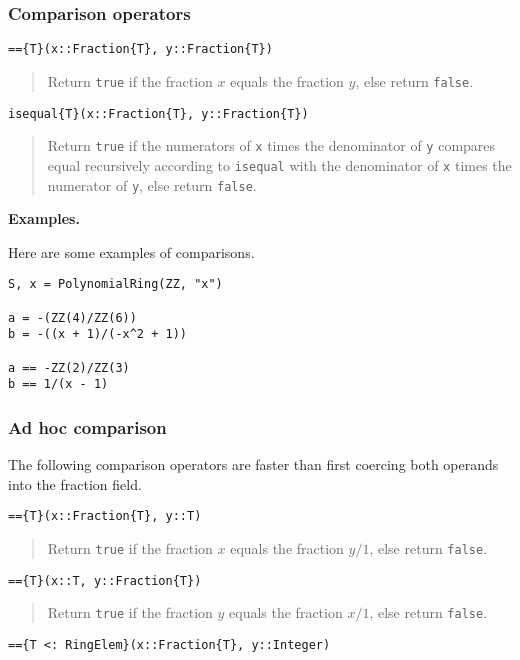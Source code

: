 \documentclass[a4paper,10pt]{article}
\newcommand{\code}{\lstinline}
\newcommand{\desc}[1]{\vspace{-3mm}\begin{quote}#1\end{quote}}
\begin{document}
\subsubsection{Comparison operators}

\begin{lstlisting}
=={T}(x::Fraction{T}, y::Fraction{T})
\end{lstlisting}

\desc{Return \code{true} if the fraction $x$ equals the fraction $y$, else
return \code{false}.}

\begin{lstlisting}
isequal{T}(x::Fraction{T}, y::Fraction{T})
\end{lstlisting}

\desc{Return \code{true} if the numerators of \code{x} times the denominator
of \code{y} compares equal recursively according to \code{isequal} with the
denominator of \code{x} times the numerator of \code{y}, else return
\code{false}.}

\textbf{Examples.}

Here are some examples of comparisons.

\begin{lstlisting}
S, x = PolynomialRing(ZZ, "x")

a = -(ZZ(4)/ZZ(6))
b = -((x + 1)/(-x^2 + 1))

a == -ZZ(2)/ZZ(3)
b == 1/(x - 1)
\end{lstlisting}

\subsubsection{Ad hoc comparison}

The following comparison operators are faster than first coercing both
operands into the fraction field.

\begin{lstlisting}
=={T}(x::Fraction{T}, y::T)
\end{lstlisting}

\desc{Return \code{true} if the fraction $x$ equals the fraction $y/1$, else
return \code{false}.}

\begin{lstlisting}
=={T}(x::T, y::Fraction{T})
\end{lstlisting}

\desc{Return \code{true} if the fraction $y$ equals the fraction $x/1$, else
return \code{false}.}

\begin{lstlisting}
=={T <: RingElem}(x::Fraction{T}, y::Integer)
\end{lstlisting}
\end{document}
